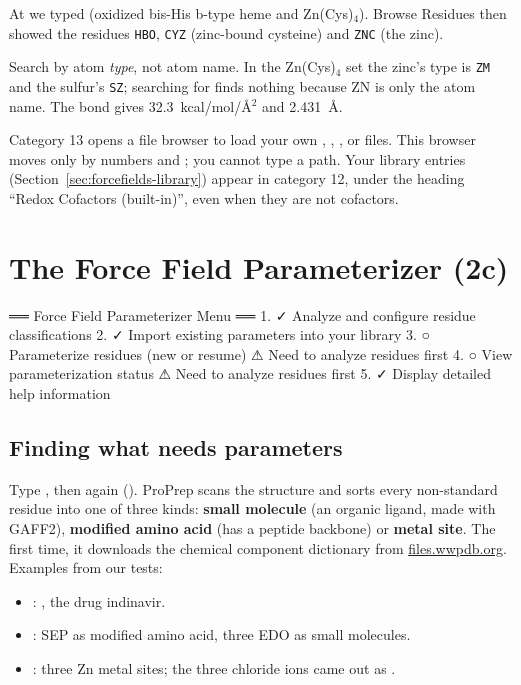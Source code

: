 At  we typed
 (oxidized bis-His b-type heme and Zn(Cys)$_4$). Browse Residues
then showed the residues \texttt{HBO}, \texttt{CYZ} (zinc-bound cysteine) and
\texttt{ZNC} (the zinc).

\begin{tip}
Search by atom \emph{type}, not atom name. In the Zn(Cys)$_4$ set the zinc's
type is \texttt{ZM} and the sulfur's \texttt{SZ}; searching for 
finds nothing because ZN is only the atom name. The bond  gives
32.3~kcal/mol/\AA$^2$ and 2.431~\AA.
\end{tip}

Category 13 opens a file browser to load your own , ,
,  or  files. This browser moves only by
numbers and ; you cannot type a path. Your library entries
(Section~\ref{sec:forcefields-library}) appear in category 12, under the
heading ``Redox Cofactors (built-in)'', even when they are not cofactors.

\section{The Force Field Parameterizer (2c)}
\label{sec:forcefields-2c}

\begin{screen}
══ Force Field Parameterizer Menu ══
  1. ✓ Analyze and configure residue classifications
  2. ✓ Import existing parameters into your library
  3. ○ Parameterize residues (new or resume)
       ⚠ Need to analyze residues first
  4. ○ View parameterization status
       ⚠ Need to analyze residues first
  5. ✓ Display detailed help information
\end{screen}

\subsection{Finding what needs parameters}

Type , then  again (). ProPrep scans the
structure and sorts every non-standard residue into one of three kinds:
\textbf{small molecule} (an organic ligand, made with GAFF2), \textbf{modified
amino acid} (has a peptide backbone) or \textbf{metal site}. The first time,
it downloads the chemical component dictionary from \url{files.wwpdb.org}.
Examples from our tests:

\begin{itemize}
  \item {}: , the drug indinavir.
  \item {}: SEP as modified amino acid, three EDO as small molecules.
  \item {}: three Zn metal sites; the three chloride ions came out as
        .
\end{itemize}

